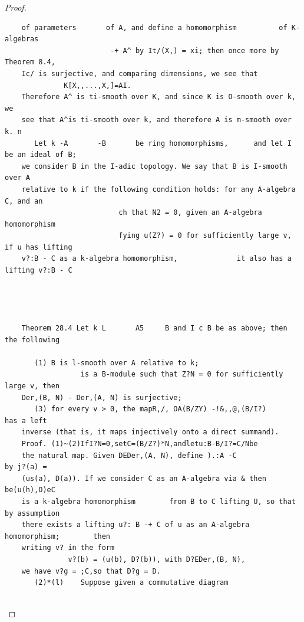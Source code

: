 \begin{proof}
\begin{verbatim}
    of parameters       of A, and define a homomorphism          of K-algebras
                         -+ A^ by It/(X,) = xi; then once more by Theorem 8.4,
    Ic/ is surjective, and comparing dimensions, we see that
              K[X,,...,X,]=AI.
    Therefore A^ is ti-smooth over K, and since K is O-smooth over k, we
    see that A^is ti-smooth over k, and therefore A is m-smooth over k. n
       Let k -A       -B       be ring homomorphisms,      and let I be an ideal of B;
    we consider B in the I-adic topology. We say that B is I-smooth over A
    relative to k if the following condition holds: for any A-algebra C, and an
                           ch that N2 = 0, given an A-algebra homomorphism
                           fying u(Z?) = 0 for sufficiently large v, if u has lifting
    v?:B - C as a k-algebra homomorphism,              it also has a lifting v?:B - C




    Theorem 28.4 Let k L       A5     B and I c B be as above; then the following

       (1) B is l-smooth over A relative to k;
                  is a B-module such that Z?N = 0 for sufficiently large v, then
    Der,(B, N) - Der,(A, N) is surjective;
       (3) for every v > 0, the mapR,/, OA(B/ZY) -!&,,@,(B/I?)             has a left
    inverse (that is, it maps injectively onto a direct summand).
    Proof. (1)~(2)IfI?N=0,setC=(B/Z?)*N,andletu:B-B/I?=C/Nbe
    the natural map. Given DEDer,(A, N), define ).:A -C                   by j?(a) =
    (us(a), D(a)). If we consider C as an A-algebra via & then be(u(h),O)eC
    is a k-algebra homomorphism        from B to C lifting U, so that by assumption
    there exists a lifting u?: B -+ C of u as an A-algebra homomorphism;        then
    writing v? in the form
               v?(b) = (u(b), D?(b)), with D?EDer,(B, N),
    we have v?g = ;C,so that D?g = D.
       (2)*(l)    Suppose given a commutative diagram


\end{verbatim}
\end{proof}
